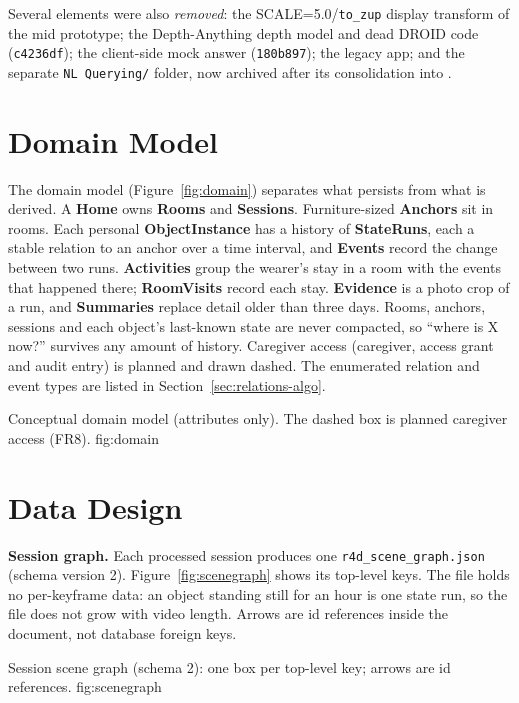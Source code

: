 Several elements were also \emph{removed}: the SCALE=5.0/\texttt{to\_zup}
display transform of the mid prototype; the Depth-Anything depth model and dead
DROID code (\texttt{c4236df}); the client-side mock answer (\texttt{180b897});
the legacy  app; and the separate \texttt{NL Querying/}
folder, now archived after its consolidation into .

\section{Domain Model}
\label{sec:domain}
The domain model (Figure~\ref{fig:domain}) separates what persists from what is
derived. A \textbf{Home} owns \textbf{Rooms} and \textbf{Sessions}.
Furniture-sized \textbf{Anchors} sit in rooms. Each personal
\textbf{ObjectInstance} has a history of \textbf{StateRuns}, each a stable
relation to an anchor over a time interval, and \textbf{Events} record the
change between two runs. \textbf{Activities} group the wearer's stay in a room
with the events that happened there; \textbf{RoomVisits} record each stay.
\textbf{Evidence} is a photo crop of a run, and \textbf{Summaries} replace
detail older than three days. Rooms, anchors, sessions and each object's
last-known state are never compacted, so ``where is X now?'' survives any
amount of history. Caregiver access (caregiver, access grant and audit entry)
is planned and drawn dashed. The enumerated relation and event types are
listed in Section~\ref{sec:relations-algo}.

  {Conceptual domain model (attributes only). The dashed box is planned
   caregiver access (FR8).}
  {fig:domain}

\section{Data Design}
\label{sec:data}
\textbf{Session graph.} Each processed session produces one
\texttt{r4d\_scene\_graph.json} (schema version 2). Figure~\ref{fig:scenegraph}
shows its top-level keys. The file holds no per-keyframe data: an object
standing still for an hour is one state run, so the file does not grow with
video length. Arrows are id references inside the document, not database
foreign keys.

  {Session scene graph (schema 2): one box per top-level key; arrows are id
   references.}
  {fig:scenegraph}

